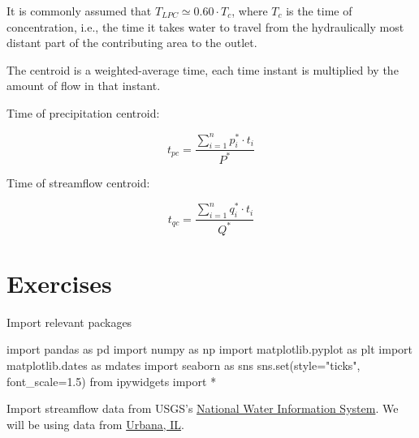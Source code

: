 \documentclass[
  letterpaper,
  DIV=11,
  numbers=noendperiod]{scrreprt}
\newenvironment{Shaded}{\begin{snugshade}}{\end{snugshade}}
\newcommand{\BuiltInTok}[1]{\textcolor[rgb]{0.00,0.23,0.31}{#1}}
\newcommand{\FloatTok}[1]{\textcolor[rgb]{0.68,0.00,0.00}{#1}}
\newcommand{\ImportTok}[1]{\textcolor[rgb]{0.00,0.46,0.62}{#1}}
\newcommand{\NormalTok}[1]{\textcolor[rgb]{0.00,0.23,0.31}{#1}}
\newcommand{\OperatorTok}[1]{\textcolor[rgb]{0.37,0.37,0.37}{#1}}
\newcommand{\StringTok}[1]{\textcolor[rgb]{0.13,0.47,0.30}{#1}}
\begin{document}
It is commonly assumed that \(T_{LPC} \simeq 0.60 \cdot T_c\), where
\(T_c\) is the time of concentration, i.e., the time it takes water to
travel from the hydraulically most distant part of the contributing area
to the outlet.

The centroid is a weighted-average time, each time instant is multiplied
by the amount of flow in that instant.

Time of precipitation centroid:

\[
t_{pc} = \frac{\displaystyle \sum_{i=1}^n p_i^* \cdot t_i}{P^*}
\]

Time of streamflow centroid:

\[
t_{qc} = \frac{\displaystyle \sum_{i=1}^n q_i^* \cdot t_i}{Q^*}
\]

\hypertarget{exercises-6}{%
\chapter{Exercises}\label{exercises-6}}

Import relevant packages

\begin{Shaded}
\begin{Highlighting}[]
\ImportTok{import}\NormalTok{ pandas }\ImportTok{as}\NormalTok{ pd}
\ImportTok{import}\NormalTok{ numpy }\ImportTok{as}\NormalTok{ np}
\ImportTok{import}\NormalTok{ matplotlib.pyplot }\ImportTok{as}\NormalTok{ plt}
\ImportTok{import}\NormalTok{ matplotlib.dates }\ImportTok{as}\NormalTok{ mdates}
\ImportTok{import}\NormalTok{ seaborn }\ImportTok{as}\NormalTok{ sns}
\NormalTok{sns.}\BuiltInTok{set}\NormalTok{(style}\OperatorTok{=}\StringTok{"ticks"}\NormalTok{, font\_scale}\OperatorTok{=}\FloatTok{1.5}\NormalTok{)}
\ImportTok{from}\NormalTok{ ipywidgets }\ImportTok{import} \OperatorTok{*}
\end{Highlighting}
\end{Shaded}

Import streamflow data from USGS's
\href{https://maps.waterdata.usgs.gov/mapper/index.html}{National Water
Information System}. We will be using data from
\href{https://waterdata.usgs.gov/nwis/inventory?agency_code=USGS\&site_no=03337100}{Urbana,
IL}.
\end{document}
